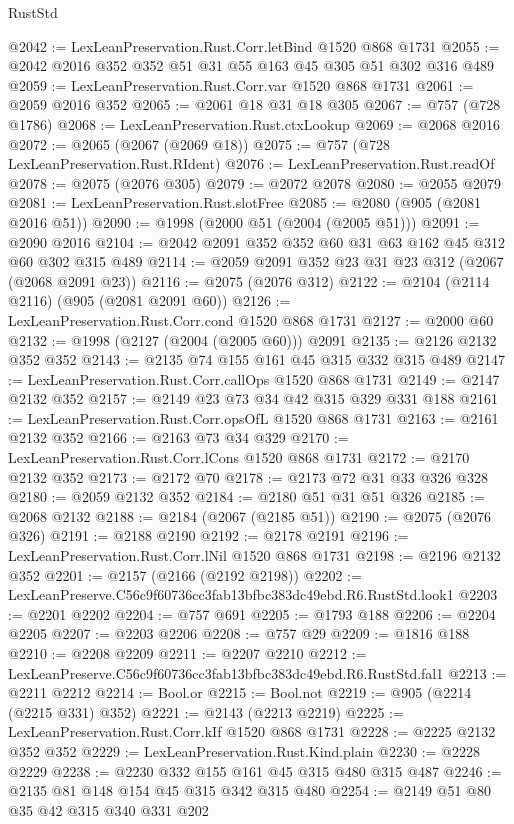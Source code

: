 \begin{lexlean}{RustStd}
\begin{coremodule}
@2042 := LexLeanPreservation.Rust.Corr.letBind @1520 @868 @1731
@2055 := @2042 @2016 @352 @352 @51 @31 @55 @163 @45 @305 @51 @302 @316 @489
@2059 := LexLeanPreservation.Rust.Corr.var @1520 @868 @1731
@2061 := @2059 @2016 @352
@2065 := @2061 @18 @31 @18 @305
@2067 := @757 (@728 @1786)
@2068 := LexLeanPreservation.Rust.ctxLookup
@2069 := @2068 @2016
@2072 := @2065 (@2067 (@2069 @18))
@2075 := @757 (@728 LexLeanPreservation.Rust.RIdent)
@2076 := LexLeanPreservation.Rust.readOf
@2078 := @2075 (@2076 @305)
@2079 := @2072 @2078
@2080 := @2055 @2079
@2081 := LexLeanPreservation.Rust.slotFree
@2085 := @2080 (@905 (@2081 @2016 @51))
@2090 := @1998 (@2000 @51 (@2004 (@2005 @51)))
@2091 := @2090 @2016
@2104 := @2042 @2091 @352 @352 @60 @31 @63 @162 @45 @312 @60 @302 @315 @489
@2114 := @2059 @2091 @352 @23 @31 @23 @312 (@2067 (@2068 @2091 @23))
@2116 := @2075 (@2076 @312)
@2122 := @2104 (@2114 @2116) (@905 (@2081 @2091 @60))
@2126 := LexLeanPreservation.Rust.Corr.cond @1520 @868 @1731
@2127 := @2000 @60
@2132 := @1998 (@2127 (@2004 (@2005 @60))) @2091
@2135 := @2126 @2132 @352 @352
@2143 := @2135 @74 @155 @161 @45 @315 @332 @315 @489
@2147 := LexLeanPreservation.Rust.Corr.callOps @1520 @868 @1731
@2149 := @2147 @2132 @352
@2157 := @2149 @23 @73 @34 @42 @315 @329 @331 @188
@2161 := LexLeanPreservation.Rust.Corr.opsOfL @1520 @868 @1731
@2163 := @2161 @2132 @352
@2166 := @2163 @73 @34 @329
@2170 := LexLeanPreservation.Rust.Corr.lCons @1520 @868 @1731
@2172 := @2170 @2132 @352
@2173 := @2172 @70
@2178 := @2173 @72 @31 @33 @326 @328
@2180 := @2059 @2132 @352
@2184 := @2180 @51 @31 @51 @326
@2185 := @2068 @2132
@2188 := @2184 (@2067 (@2185 @51))
@2190 := @2075 (@2076 @326)
@2191 := @2188 @2190
@2192 := @2178 @2191
@2196 := LexLeanPreservation.Rust.Corr.lNil @1520 @868 @1731
@2198 := @2196 @2132 @352
@2201 := @2157 (@2166 (@2192 @2198))
@2202 := LexLeanPreserve.C56c9f60736cc3fab13bfbc383dc49ebd.R6.RustStd.look1
@2203 := @2201 @2202
@2204 := @757 @691
@2205 := @1793 @188
@2206 := @2204 @2205
@2207 := @2203 @2206
@2208 := @757 @29
@2209 := @1816 @188
@2210 := @2208 @2209
@2211 := @2207 @2210
@2212 := LexLeanPreserve.C56c9f60736cc3fab13bfbc383dc49ebd.R6.RustStd.fal1
@2213 := @2211 @2212
@2214 := Bool.or
@2215 := Bool.not
@2219 := @905 (@2214 (@2215 @331) @352)
@2221 := @2143 (@2213 @2219)
@2225 := LexLeanPreservation.Rust.Corr.kIf @1520 @868 @1731
@2228 := @2225 @2132 @352 @352
@2229 := LexLeanPreservation.Rust.Kind.plain
@2230 := @2228 @2229
@2238 := @2230 @332 @155 @161 @45 @315 @480 @315 @487
@2246 := @2135 @81 @148 @154 @45 @315 @342 @315 @480
@2254 := @2149 @51 @80 @35 @42 @315 @340 @331 @202

\end{coremodule}
\end{lexlean}
